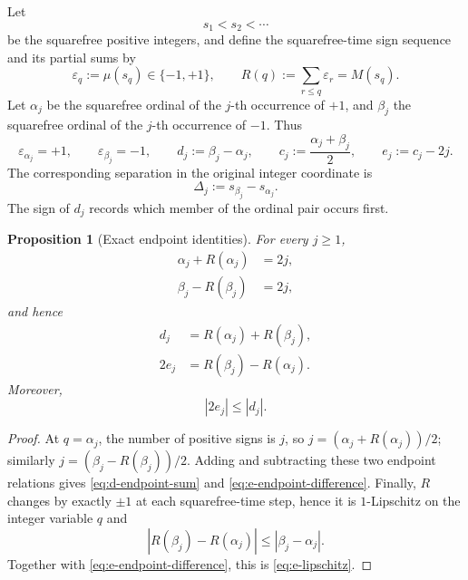 \documentclass[11pt]{amsart}
\numberwithin{equation}{section}
\theoremstyle{plain}
\newtheorem{proposition}[theorem]{Proposition}
\theoremstyle{definition}
\theoremstyle{remark}
\begin{document}
Let
\begin{equation}
\label{eq:squarefree-order}
s_1<s_2<\cdots
\end{equation}
be the squarefree positive integers, and define the squarefree-time sign sequence
and its partial sums by
\begin{equation}
\label{eq:squarefree-walk}
\varepsilon_q:=\mu(s_q)\in\{-1,+1\},
\qquad
R(q):=\sum_{r\le q}\varepsilon_r=M(s_q).
\end{equation}
Let $\alpha_j$ be the squarefree ordinal of the $j$-th occurrence of $+1$, and
$\beta_j$ the squarefree ordinal of the $j$-th occurrence of $-1$.  Thus
\begin{equation}
\label{eq:pairing-definitions}
\varepsilon_{\alpha_j}=+1,
\qquad
\varepsilon_{\beta_j}=-1,
\qquad
d_j:=\beta_j-\alpha_j,
\qquad
c_j:=\frac{\alpha_j+\beta_j}{2},
\qquad
e_j:=c_j-2j.
\end{equation}
The corresponding separation in the original integer coordinate is
\begin{equation}
\label{eq:integer-pairing-displacement}
\Delta_j:=s_{\beta_j}-s_{\alpha_j}.
\end{equation}
The sign of $d_j$ records which member of the ordinal pair occurs first.

\begin{proposition}[Exact endpoint identities]
\label{prop:pairing-endpoints}
For every $j\ge1$,
\begin{align}
\alpha_j+R(\alpha_j)&=2j,
\label{eq:alpha-endpoint}\\[2mm]
\beta_j-R(\beta_j)&=2j,
\label{eq:beta-endpoint}
\end{align}
and hence
\begin{align}
d_j&=R(\alpha_j)+R(\beta_j),
\label{eq:d-endpoint-sum}\\
2e_j&=R(\beta_j)-R(\alpha_j).
\label{eq:e-endpoint-difference}
\end{align}
Moreover,
\begin{equation}
\label{eq:e-lipschitz}
|2e_j|\le |d_j|.
\end{equation}
\end{proposition}

\begin{proof}
At $q=\alpha_j$, the number of positive signs is $j$, so
$j=(\alpha_j+R(\alpha_j))/2$; similarly
$j=(\beta_j-R(\beta_j))/2$.  Adding and subtracting these two endpoint
relations gives \eqref{eq:d-endpoint-sum} and
\eqref{eq:e-endpoint-difference}.  Finally, $R$ changes by exactly $\pm1$ at
each squarefree-time step, hence it is $1$-Lipschitz on the integer variable
$q$ and
\begin{equation}
\label{eq:R-lipschitz-pair}
|R(\beta_j)-R(\alpha_j)|\le |\beta_j-\alpha_j|.
\end{equation}
Together with \eqref{eq:e-endpoint-difference}, this is
\eqref{eq:e-lipschitz}.
\end{proof}
\end{document}
